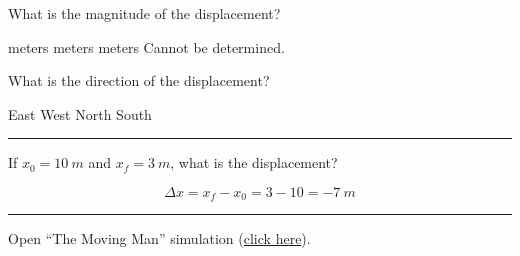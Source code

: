 \documentclass[]{exam}
\begin{document}
\begin{questions}
\begin{questions}
\question
What is the magnitude of the displacement?

\begin{choices}
 meters
 meters
 meters
\choice Cannot be determined.
\end{choices}

\question \label{ques:Skier_end}
What is the direction of the displacement?

\begin{choices}
\choice East
\CorrectChoice West
\choice North   
\choice South
\end{choices}

\vspace{1em} \hrule

\question
If $x_0 = \SI{10}{m}$ and $x_f = \SI{3}{m}$, what is the displacement?

\begin{solution}
\begin{equation*}
    \Delta{x} = x_f - x_0 = 3 - 10 = \SI{-7}{m} 
\end{equation*}
\end{solution}


\vspace{1em}
\hrule

\question
Open ``The Moving Man'' simulation (\href{https://archive.cnx.org/specials/e2ca52af-8c6b-450e-ac2f-9300b38e8739/moving-man/}{click here}). 

\end{questions}
\end{questions}
\end{document}
